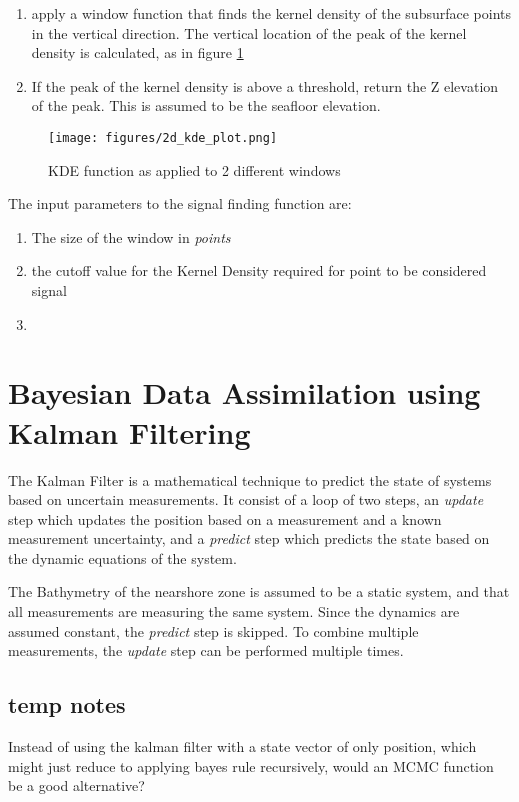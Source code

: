 \begin{enumerate}
    \item apply a window function that finds the kernel density of the subsurface points in the vertical direction. The vertical location of the peak of the kernel density is calculated, as in figure \ref{fig:kdefunc}
    \item If the peak of the kernel density is above a threshold, return the Z elevation of the peak. This is assumed to be the seafloor elevation.
\end{enumerate}

\begin{figure}[htbp]
    \centering
    \texttt{[image: figures/2d\_kde\_plot.png]}
    \caption{KDE function as applied to 2 different windows}
    \label{fig:kdefunc}
\end{figure}


The input parameters to the signal finding function are:

\begin{enumerate}
    \item The size of the window in \emph{points}
    \item the cutoff value for the Kernel Density required for point to be considered signal
    \item 
\end{enumerate}

\section{Bayesian Data Assimilation using Kalman Filtering}
The Kalman Filter is a mathematical technique to predict the state of systems based on uncertain measurements. It consist of a loop of two steps, an \emph{update} step which updates the position based on a measurement and a known measurement uncertainty, and a \emph{predict} step which predicts the state based on the dynamic equations of the system. 

The Bathymetry of the nearshore zone is assumed to be a static system, and that all measurements are measuring the same system. Since the dynamics are assumed constant, the \emph{predict} step is skipped. To combine multiple measurements, the \emph{update} step can be performed multiple times. 

\subsection*{temp notes}
Instead of using the kalman filter with a state vector of only position, which might just reduce to applying bayes rule recursively, would an MCMC function be a good alternative? 

